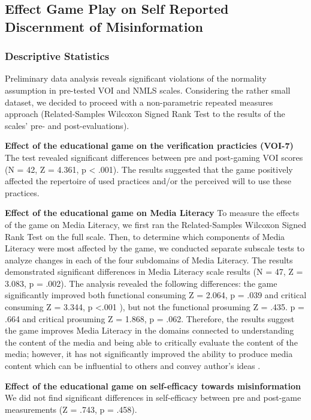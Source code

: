 \subsection{Effect Game Play on Self Reported Discernment of Misinformation}
\subsubsection {Descriptive Statistics}
Preliminary data analysis reveals significant violations of the normality assumption in pre-tested VOI and NMLS scales. Considering the rather small dataset, we decided to proceed with a non-parametric repeated measures approach (Related-Samples Wilcoxon Signed Rank Test to the results of the scales' pre- and post-evaluations).

\textbf{Effect of the educational game on the verification practicies (VOI-7)}
The test revealed significant differences between pre and post-gaming VOI scores (N = 42, Z = 4.361, p < .001). The results suggested that the game positively affected the repertoire of used practices and/or the perceived will to use these practices. 

\textbf{Effect of the educational game on Media Literacy}
To measure the effects of the game on Media Literacy, we first ran the Related-Samples Wilcoxon Signed Rank Test on the full scale. Then, to determine which components of Media Literacy were most affected by the game, we conducted separate subscale tests to analyze changes in each of the four subdomains of Media Literacy. The results demonstrated significant differences in Media Literacy scale results (N = 47, Z = 3.083, p = .002). The analysis revealed the following differences: the game significantly improved both functional consuming   Z = 2.064, p = .039 and critical consuming Z = 3.344, p <.001 ), but not the functional prosuming Z = .435. p = .664 and critical prosuming Z = 1.868, p = .062. Therefore, the results suggest the game improves Media Literacy in the domains connected to understanding the content of the media and being able to critically evaluate the content of the media; however, it has not significantly improved the ability to produce media content which can be influential to others and convey author's ideas \cite{koc2016development}.

\textbf{Effect of the educational game on self-efficacy towards misinformation}
We did not find significant differences in self-efficacy between pre and post-game measurements (Z = .743, p = .458). 

